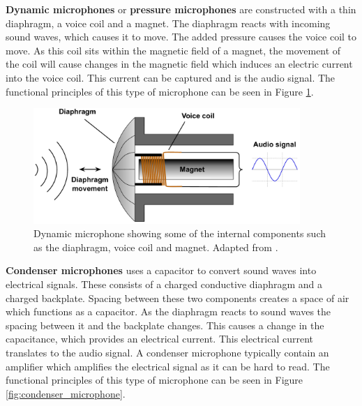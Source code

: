 \textbf{Dynamic microphones} or \textbf{pressure microphones} are constructed with a thin diaphragm, a voice coil and a magnet. The diaphragm reacts with incoming sound waves, which causes it to move. The added pressure causes the voice coil to move. As this coil sits within the magnetic field of a magnet, the movement of the coil will cause changes in the magnetic field which induces an electric current into the voice coil. This current can be captured and is the audio signal. The functional principles of this type of microphone can be seen in Figure \ref{fig:dynamic_microphone}. \cite{Acoustics:Audio_production} 

\begin{figure}[H]
    \centering
    \includegraphics[width=0.9\textwidth]{figures/1Problem_analysis/Dynamic_microphone.pdf}
    \caption{Dynamic microphone showing some of the internal components such as the diaphragm, voice coil and magnet. Adapted from \cite{Acoustics:Audio_production, Acoustics:Jespers_slides}.}
    \label{fig:dynamic_microphone}
\end{figure}

\textbf{Condenser microphones} uses a capacitor to convert sound waves into electrical signals. These consists of a charged conductive diaphragm and a charged backplate. Spacing between these two components creates a space of air which functions as a capacitor. As the diaphragm reacts to sound waves the spacing between it and the backplate changes. This causes a change in the capacitance, which provides an electrical current. This electrical current translates to the audio signal. A condenser microphone typically contain an amplifier which amplifies the electrical signal as it can be hard to read. The functional principles of this type of microphone can be seen in Figure \ref{fig:condenser_microphone}.\cite{Acoustics:Audio_production} 

